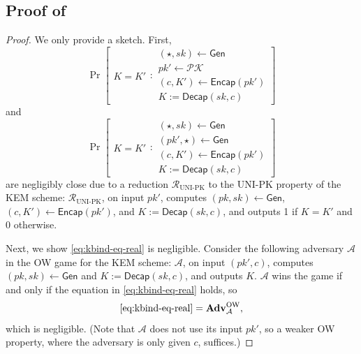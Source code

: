 \documentclass{article}
\theoremstyle{plain}
\theoremstyle{definition}
\theoremstyle{remark}
\newcommand{\pkspace}{\mathcal{PK}}
\newcommand{\adv}{\mathcal{A}}
\newcommand{\red}{\mathcal{R}}
\newcommand{\Adv}{\mathbf{Adv}}
\newcommand{\Gen}{\mathsf{Gen}}
\newcommand{\Encap}{\mathsf{Encap}}
\newcommand{\Decap}{\mathsf{Decap}}
\begin{document}
\subsection{Proof of }
\label{app:kbind-eq-proof}
\begin{proof}
We only provide a sketch. First,
\[
      \operatorname{Pr}
      \left[
      \begin{array}{c}
      K = K'
      \end{array}
      :
      \begin{array}{c}
      (\star,sk) \gets \Gen \\
      pk' \gets \pkspace \\
      (c,K') \gets \Encap(pk') \\
      K := \Decap(sk,c)
      \end{array}
      \right]
\]
and
\begin{equation}
\label{eq:kbind-eq-real}
      \operatorname{Pr}
      \left[
      \begin{array}{c}
      K = K'
      \end{array}
      :
      \begin{array}{c}
      (\star,sk) \gets \Gen \\
      (pk',\star) \gets \Gen \\
      (c,K') \gets \Encap(pk') \\
      K := \Decap(sk,c)
      \end{array}
      \right]
\tag{\textdagger}
\end{equation}
are negligibly close due to a reduction $\red_\text{UNI-PK}$ to the UNI-PK property of the KEM scheme: $\red_\text{UNI-PK}$, on input $pk'$, computes $(pk,sk) \gets \Gen$, $(c,K') \gets \Encap(pk')$, and $K := \Decap(sk,c)$, and outputs 1 if $K = K'$ and 0 otherwise.

Next, we show \eqref{eq:kbind-eq-real} is negligible. Consider the following adversary $\adv$ in the OW game for the KEM scheme: $\adv$, on input $(pk',c)$, computes $(pk,sk) \gets \Gen$ and $K := \Decap(sk,c)$, and outputs $K$. $\adv$ wins the game if and only if the equation in \eqref{eq:kbind-eq-real} holds, so
\[
\eqref{eq:kbind-eq-real} = \Adv_{\adv}^\text{OW},
\]
which is negligible. (Note that $\adv$ does not use its input $pk'$, so a weaker OW property, where the adversary is only given $c$, suffices.)
\end{proof}
\end{document}
